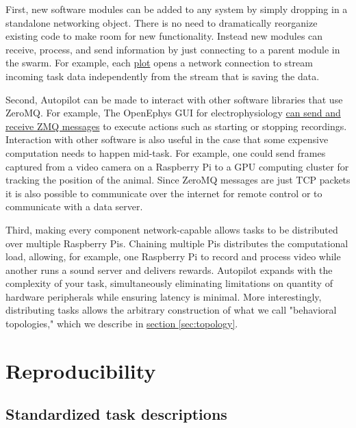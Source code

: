 First, new software modules can be added to any system by simply dropping in a standalone networking object. There is no need to dramatically reorganize existing code to make room for new functionality. Instead new modules can receive, process, and send information by just connecting to a parent module in the swarm. For example, each \hyperref[sec:plotting]{plot} opens a network connection to stream incoming task data independently from the stream that is saving the data.

Second, Autopilot can be made to interact with other software libraries that use ZeroMQ. For example, The OpenEphys GUI for electrophysiology \href{https://open-ephys.atlassian.net/wiki/spaces/OEW/pages/23265310/Network+Events}{can send and receive ZMQ messages} to execute actions such as starting or stopping recordings. Interaction with other software is also useful in the case that some expensive computation needs to happen mid-task. For example, one could send frames captured from a video camera on a Raspberry Pi to a GPU computing cluster for tracking the position of the animal. Since ZeroMQ messages are just TCP packets it is also possible to communicate over the internet for remote control or to communicate with a data server.

Third, making every component network-capable allows tasks to be distributed over multiple Raspberry Pis. Chaining multiple Pis distributes the computational load, allowing, for example, one Raspberry Pi to record and process video while another runs a sound server and delivers rewards. Autopilot expands with the complexity of your task, simultaneously eliminating limitations on quantity of hardware peripherals while ensuring latency is minimal. More interestingly, distributing tasks allows the arbitrary construction of what we call "behavioral topologies," which we describe in \hyperref[sec:topology]{section \ref*{sec:topology}}.

\clearpage

\section{Reproducibility}
\label{sec:reproducibility}

\subsection{Standardized task descriptions}

